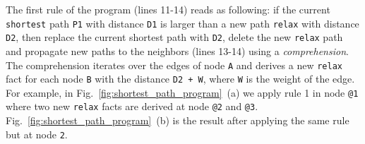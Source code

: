 \begin{dblfig}
\vspace*{-2ex}
\begin{center}
  \hspace{0.4cm}
  \hspace{0.4cm}
\end{center}
\vspace*{-1ex}
\end{dblfig}


The first rule of the program (lines 11-14) reads as following: if the current
\texttt{shortest} path \texttt{P1} with distance \texttt{D1} is larger
than a new path \texttt{relax} with distance \texttt{D2}, then replace the
current shortest path with \texttt{D2}, delete the new \texttt{relax} path and
propagate new paths to the neighbors (lines 13-14) using a \emph{comprehension}.
The comprehension iterates over the edges of node \texttt{A} and derives a new
\texttt{relax} fact for each node \texttt{B} with the distance \texttt{D2 + W},
where \texttt{W} is the weight of the edge. For
example, in Fig.~\ref{fig:shortest_path_program}~(a) we apply rule 1 in node
\texttt{@1} where two new \texttt{relax} facts are derived at node \texttt{@2}
and \texttt{@3}. Fig.~\ref{fig:shortest_path_program}~(b) is the result after
applying the same rule but at node \texttt{2}.

